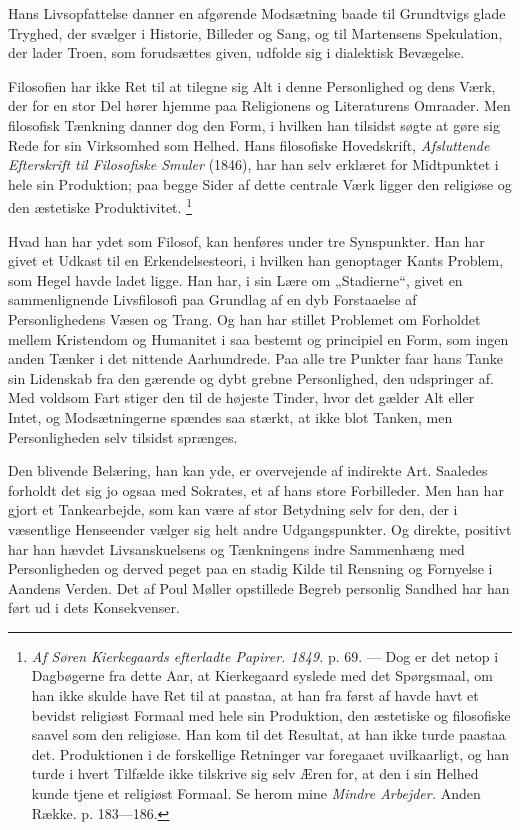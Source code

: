 \documentclass[12pt,a4paper,openany]{book}
\newcommand{\opage}[1]{\marginnote{\footnotesize\textit{[#1]}}}
\begin{document}
Hans Livsopfattelse danner en afgørende Modsætning baade til Grundtvigs glade
Tryghed, der svælger i Historie, Billeder og Sang, og til Martensens
Spekulation, der lader Troen, som forudsættes given, udfolde sig i dialektisk
Bevægelse.

Filosofien har ikke Ret til at tilegne sig Alt i denne Personlighed og dens
Værk, der for en stor Del hører hjemme paa Religionens og Literaturens
Omraader. Men filosofisk Tænkning danner dog den Form, i hvilken han tilsidst
søgte at gøre sig Rede for sin Virksomhed som Helhed. Hans filosofiske
Hovedskrift, \textit{Afsluttende Efterskrift til Filosofiske Smuler} (1846),
har han selv erklæret for Midtpunktet i hele sin Produktion; paa begge Sider af
dette centrale Værk ligger den religiøse og den æstetiske Produktivitet.%
\footnote[1]{\textit{Af Søren Kierkegaards efterladte Papirer. 1849.} p. 69.
--- Dog er det netop i Dagbøgerne fra dette Aar, at Kierkegaard syslede med det
Spørgsmaal, om han ikke skulde have Ret til at paastaa, at han fra først af
havde havt et bevidst religiøst Formaal med hele sin Produktion, den æstetiske
og filosofiske saavel som den religiøse. Han kom til det Resultat, at han ikke
turde paastaa det. Produktionen i de forskellige Retninger var foregaaet
uvilkaarligt, og han turde i hvert Tilfælde ikke tilskrive sig selv Æren for,
at den i sin Helhed kunde tjene et religiøst Formaal. Se herom mine
\textit{Mindre Arbejder.} Anden Række. p. 183---186.}

\setcounter{footnote}{0}%
\opage{148}Hvad han har ydet som Filosof, kan henføres under tre Synspunkter.
Han har givet et Udkast til en Erkendelsesteori, i hvilken han genoptager Kants
Problem, som Hegel havde ladet ligge. Han har, i sin Lære om „Stadierne“, givet
en sammenlignende Livsfilosofi paa Grundlag af en dyb Forstaaelse af
Personlighedens Væsen og Trang. Og han har stillet Problemet om Forholdet
mellem Kristendom og Humanitet i saa bestemt og principiel en Form, som ingen
anden Tænker i det nittende Aarhundrede. Paa alle tre Punkter faar hans Tanke
sin Lidenskab fra den gærende og dybt grebne Personlighed, den udspringer af.
Med voldsom Fart stiger den til de højeste Tinder, hvor det gælder Alt eller
Intet, og Modsætningerne spændes saa stærkt, at ikke blot Tanken, men
Personligheden selv tilsidst sprænges.

Den blivende Belæring, han kan yde, er overvejende af indirekte Art. Saaledes
forholdt det sig jo ogsaa med Sokrates, et af hans store Forbilleder. Men han
har gjort et Tankearbejde, som kan være af stor Betydning selv for den, der i
væsentlige Henseender vælger sig helt andre Udgangspunkter. Og direkte,
positivt har han hævdet Livsanskuelsens og Tænkningens indre Sammenhæng med
Personligheden og derved peget paa en stadig Kilde til Rensning og Fornyelse i
Aandens Verden. Det af Poul Møller opstillede Begreb personlig Sandhed har han
ført ud i dets Konsekvenser.
\end{document}
